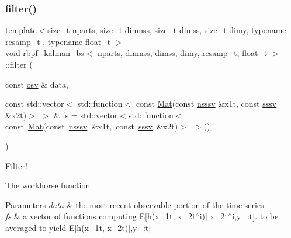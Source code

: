 \subsubsection{\texorpdfstring{filter()}{filter()}}
{\footnotesize\ttfamily template$<$size\+\_\+t nparts, size\+\_\+t dimnss, size\+\_\+t dimss, size\+\_\+t dimy, typename resamp\+\_\+t , typename float\+\_\+t $>$ \\
void \hyperlink{classrbpf__kalman__bs}{rbpf\+\_\+kalman\+\_\+bs}$<$ nparts, dimnss, dimss, dimy, resamp\+\_\+t, float\+\_\+t $>$\+::filter (\begin{DoxyParamCaption}\item[{const \hyperlink{classrbpf__kalman__bs_a51f159fe3b1d23742ba06d82d4724186}{osv} \&}]{data,  }\item[{const std\+::vector$<$ std\+::function$<$ const \hyperlink{classrbpf__kalman__bs_add5db33a27f25ec3e72ecd8e4c9ce755}{Mat}(const \hyperlink{classrbpf__kalman__bs_a896c6ca25182e5569df4bfa6c40f9a54}{nsssv} \&x1t, const \hyperlink{classrbpf__kalman__bs_a2b40c9fa0d7a2ca42be3d0c43db0db8b}{sssv} \&x2t)$>$ $>$ \&}]{fs = {\ttfamily std\+:\+:vector$<$std\+:\+:function$<$const~\hyperlink{classrbpf__kalman__bs_add5db33a27f25ec3e72ecd8e4c9ce755}{Mat}(const~\hyperlink{classrbpf__kalman__bs_a896c6ca25182e5569df4bfa6c40f9a54}{nsssv}~\&x1t,~const~\hyperlink{classrbpf__kalman__bs_a2b40c9fa0d7a2ca42be3d0c43db0db8b}{sssv}~\&x2t)$>$~$>$()} }\end{DoxyParamCaption})}



Filter! 

The workhorse function 
\begin{DoxyParams}{Parameters}
{\em data} & the most recent observable portion of the time series. \\
\hline
{\em fs} & a vector of functions computing E\mbox{[}h(x\+\_\+1t, x\+\_\+2t$^\wedge$i)$\vert$ x\+\_\+2t$^\wedge$i,y\+\_\+:t\mbox{]}. to be averaged to yield E\mbox{[}h(x\+\_\+1t, x\+\_\+2t)$\vert$,y\+\_\+:t\mbox{]} \\
\hline
\end{DoxyParams}
\mbox{\label{classrbpf__kalman__bs_afce6418525aea80ea8f073eda77bb6f4}} 
